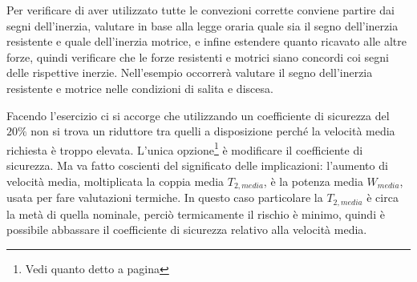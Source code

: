 Per verificare di aver utilizzato tutte le convezioni corrette conviene partire dai segni dell'inerzia, valutare in base alla legge oraria quale sia il segno dell'inerzia resistente e quale dell'inerzia motrice, e infine estendere quanto ricavato alle altre forze, quindi verificare che le forze resistenti e motrici siano concordi coi segni delle rispettive inerzie.
Nell'esempio occorrerà valutare il segno dell'inerzia resistente e motrice nelle condizioni di salita e discesa.

Facendo l'esercizio ci si accorge che utilizzando un coefficiente di sicurezza del $20\%$ non si trova un riduttore tra quelli a disposizione perché la velocità media richiesta è troppo elevata. L'unica opzione\footnote{Vedi quanto detto a pagina \pageref{rivalutazione_coeff_sic}} è modificare il coefficiente di sicurezza. 
Ma va fatto coscienti del significato delle implicazioni: l'aumento di velocità media, moltiplicata la coppia media $T_{2,media}$, è la potenza media $W_{media}$, usata per fare valutazioni termiche.
In questo caso particolare la $T_{2,media}$ è circa la metà di quella nominale, perciò termicamente il rischio è minimo, quindi è possibile abbassare il coefficiente di sicurezza relativo alla velocità media.